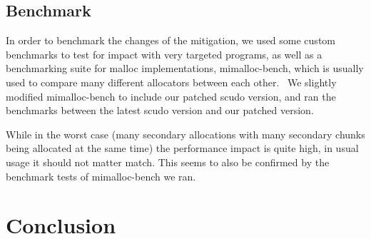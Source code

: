 \documentclass[a4paper,11pt,oneside]{report}
\begin{document}
\section{Benchmark}

In order to benchmark the changes of the mitigation, we used some custom benchmarks
to test for impact with very targeted programs, as well as a benchmarking suite
for malloc implementations, mimalloc-bench, which is usually used to compare many
different allocators between each other.~\cite{mimalloc-bench} We slightly modified
mimalloc-bench to include our patched scudo version, and ran the benchmarks between
the latest scudo version and our patched version.

While in the worst case (many secondary allocations with many secondary chunks being allocated at the same time) the performance impact is quite high, in usual usage it should not matter match. This seems to also be confirmed by the benchmark tests of mimalloc-bench we ran.


\chapter{Conclusion}



\cleardoublepage{}
\printbibliography{}
\end{document}
